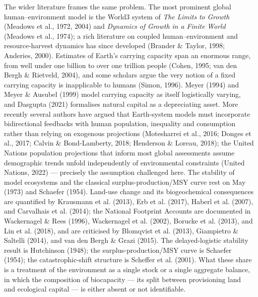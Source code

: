 \documentclass[11pt]{article}
\begin{document}
The wider literature frames the same problem. The most prominent global human--environment model is the World3 system of \emph{The Limits to Growth} (Meadows et al., 1972, 2004) and \emph{Dynamics of Growth in a Finite World} (Meadows et al., 1974); a rich literature on coupled human--environment and resource-harvest dynamics has since developed (Brander \& Taylor, 1998; Anderies, 2000). Estimates of Earth's carrying capacity span an enormous range, from well under one billion to over one trillion people (Cohen, 1995; van den Bergh \& Rietveld, 2004), and some scholars argue the very notion of a fixed carrying capacity is inapplicable to humans (Simon, 1996). Meyer (1994) and Meyer \& Ausubel (1999) model carrying capacity as itself logistically varying, and Dasgupta (2021) formalises natural capital as a depreciating asset. More recently several authors have argued that Earth-system models must incorporate bidirectional feedbacks with human population, inequality and consumption rather than relying on exogenous projections (Motesharrei et al., 2016; Donges et al., 2017; Calvin \& Bond-Lamberty, 2018; Henderson \& Loreau, 2018); the United Nations population projections that inform most global assessments assume demographic trends unfold independently of environmental constraints (United Nations, 2022) --- precisely the assumption challenged here. The stability of model ecosystems and the classical surplus-production/MSY curve rest on May (1973) and Schaefer (1954). Land-use change and its biogeochemical consequences are quantified by Krausmann et al. (2013), Erb et al. (2017), Haberl et al. (2007), and Carvalhais et al. (2014); the National Footprint Accounts are documented in Wackernagel \& Rees (1996), Wackernagel et al. (2002), Borucke et al. (2013), and Lin et al. (2018), and are criticised by Blomqvist et al. (2013), Giampietro \& Saltelli (2014), and van den Bergh \& Grazi (2015). The delayed-logistic stability result is Hutchinson (1948); the surplus-production/MSY curve is Schaefer (1954); the catastrophic-shift structure is Scheffer et al. (2001). What these share is a treatment of the environment as a single stock or a single aggregate balance, in which the composition of biocapacity --- its split between provisioning land and ecological capital --- is either absent or not identifiable.
\end{document}
